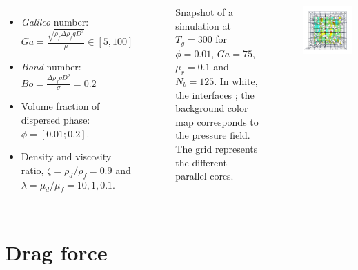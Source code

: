 \documentclass{sintefbeamer}
\begin{document}
\begin{frame}
\begin{columns}
{  \begin{itemize}
    \item \textit{Galileo} number: $Ga =\frac{\sqrt{\rho_f \Delta\rho_f gD^3}}{\mu} \in [5, 100]$
    \item \textit{Bond} number: $Bo = \frac{\Delta \rho_f g D^2}{\sigma} = 0.2$ 
    \item Volume fraction of dispersed phase: $\phi = [0.01;0.2]$. 
    \item Density and viscosity ratio, $\zeta=\rho_d/\rho_f=0.9$ and $\lambda=\mu_d/\mu_f= 10,1,0.1$. 
  \end{itemize}
  }
  \begin{figure}
    \caption{Snapshot of a simulation at $T_g = 300$ for $\phi = 0.01$, $Ga = 75$, $\mu_r = 0.1$ and $N_b = 125$. In white, the interfaces ; the background color map corresponds to the pressure field. The grid represents the different parallel cores.
    }
  \end{figure}
  \centering
  \href{/work/fintzin/BUBLLES_PROJECT/movies/layers.mp4}{}
  \includegraphics[width =  1.1\textwidth]{image/PHI_01_Ga_75.png}
  \end{columns}
\end{frame}

\section{Drag force}
\end{document}
